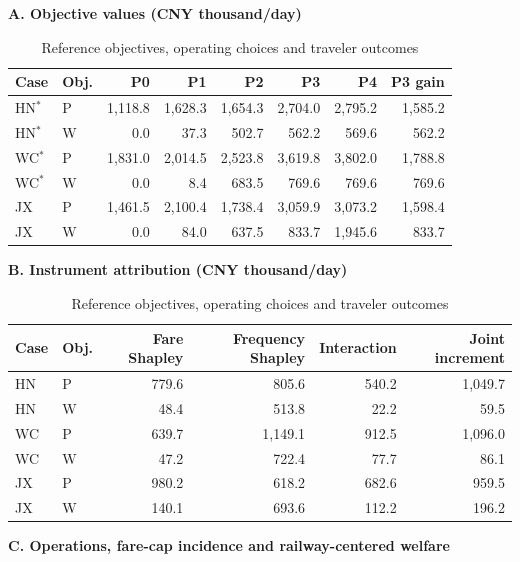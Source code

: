 \begin{table}[htbp]\centering
\caption{Reference objectives, operating choices and traveler outcomes}\label{tab:baseline_policy_values}
\begin{minipage}{.95\textwidth}\fontsize{8}{10}\selectfont{}\setlength{\tabcolsep}{2pt}\renewcommand{\arraystretch}{1.08}
\par\noindent\textbf{A. Objective values (CNY thousand/day)}\par\smallskip
\begin{tabular*}{\linewidth}{@{\extracolsep{\fill}}llrrrrrr@{}}\toprule
Case & Obj. & P0 & P1 & P2 & P3 & P4 & P3 gain \\
\midrule
HN$^{*}$ & P & 1,118.8 & 1,628.3 & 1,654.3 & 2,704.0 & 2,795.2 & 1,585.2 \\
HN$^{*}$ & W & 0.0 & 37.3 & 502.7 & 562.2 & 569.6 & 562.2 \\
WC$^{*}$ & P & 1,831.0 & 2,014.5 & 2,523.8 & 3,619.8 & 3,802.0 & 1,788.8 \\
WC$^{*}$ & W & 0.0 & 8.4 & 683.5 & 769.6 & 769.6 & 769.6 \\
JX & P & 1,461.5 & 2,100.4 & 1,738.4 & 3,059.9 & 3,073.2 & 1,598.4 \\
JX & W & 0.0 & 84.0 & 637.5 & 833.7 & 1,945.6 & 833.7 \\
\bottomrule\end{tabular*}\par\medskip
\par\noindent\textbf{B. Instrument attribution (CNY thousand/day)}\par\smallskip
\begin{tabular*}{\linewidth}{@{\extracolsep{\fill}}llrrrr@{}}\toprule
Case & Obj. & Fare Shapley & Frequency Shapley & Interaction & Joint increment \\
\midrule
HN & P & 779.6 & 805.6 & 540.2 & 1,049.7 \\
HN & W & 48.4 & 513.8 & 22.2 & 59.5 \\
WC & P & 639.7 & 1,149.1 & 912.5 & 1,096.0 \\
WC & W & 47.2 & 722.4 & 77.7 & 86.1 \\
JX & P & 980.2 & 618.2 & 682.6 & 959.5 \\
JX & W & 140.1 & 693.6 & 112.2 & 196.2 \\
\bottomrule\end{tabular*}\par\medskip
\par\noindent\textbf{C. Operations, fare-cap incidence and railway-centered welfare}\par\smallskip

\end{minipage}
\end{table}
